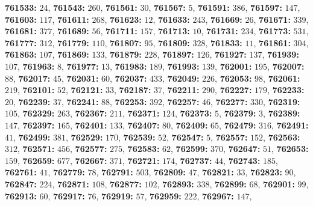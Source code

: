 \textsf{\bfseries 761533:} $24$, \textsf{\bfseries 761543:} $260$, \textsf{\bfseries 761561:} $30$, \textsf{\bfseries 761567:} $5$, \textsf{\bfseries 761591:} $386$, \textsf{\bfseries 761597:} $147$, \textsf{\bfseries 761603:} $117$, \textsf{\bfseries 761611:} $268$, \textsf{\bfseries 761623:} $12$, \textsf{\bfseries 761633:} $243$, \textsf{\bfseries 761669:} $26$, \textsf{\bfseries 761671:} $339$, \textsf{\bfseries 761681:} $377$, \textsf{\bfseries 761689:} $56$, \textsf{\bfseries 761711:} $157$, \textsf{\bfseries 761713:} $10$, \textsf{\bfseries 761731:} $234$, \textsf{\bfseries 761773:} $531$, \textsf{\bfseries 761777:} $312$, \textsf{\bfseries 761779:} $110$, \textsf{\bfseries 761807:} $95$, \textsf{\bfseries 761809:} $328$, \textsf{\bfseries 761833:} $11$, \textsf{\bfseries 761861:} $304$, \textsf{\bfseries 761863:} $107$, \textsf{\bfseries 761869:} $133$, \textsf{\bfseries 761879:} $228$, \textsf{\bfseries 761897:} $126$, \textsf{\bfseries 761927:} $137$, \textsf{\bfseries 761939:} $107$, \textsf{\bfseries 761963:} $8$, \textsf{\bfseries 761977:} $13$, \textsf{\bfseries 761983:} $189$, \textsf{\bfseries 761993:} $139$, \textsf{\bfseries 762001:} $195$, \textsf{\bfseries 762007:} $88$, \textsf{\bfseries 762017:} $45$, \textsf{\bfseries 762031:} $60$, \textsf{\bfseries 762037:} $433$, \textsf{\bfseries 762049:} $226$, \textsf{\bfseries 762053:} $98$, \textsf{\bfseries 762061:} $219$, \textsf{\bfseries 762101:} $52$, \textsf{\bfseries 762121:} $33$, \textsf{\bfseries 762187:} $37$, \textsf{\bfseries 762211:} $290$, \textsf{\bfseries 762227:} $179$, \textsf{\bfseries 762233:} $20$, \textsf{\bfseries 762239:} $37$, \textsf{\bfseries 762241:} $88$, \textsf{\bfseries 762253:} $392$, \textsf{\bfseries 762257:} $46$, \textsf{\bfseries 762277:} $330$, \textsf{\bfseries 762319:} $105$, \textsf{\bfseries 762329:} $263$, \textsf{\bfseries 762367:} $211$, \textsf{\bfseries 762371:} $124$, \textsf{\bfseries 762373:} $5$, \textsf{\bfseries 762379:} $3$, \textsf{\bfseries 762389:} $147$, \textsf{\bfseries 762397:} $165$, \textsf{\bfseries 762401:} $133$, \textsf{\bfseries 762407:} $80$, \textsf{\bfseries 762409:} $65$, \textsf{\bfseries 762479:} $316$, \textsf{\bfseries 762491:} $41$, \textsf{\bfseries 762499:} $381$, \textsf{\bfseries 762529:} $170$, \textsf{\bfseries 762539:} $52$, \textsf{\bfseries 762547:} $5$, \textsf{\bfseries 762557:} $152$, \textsf{\bfseries 762563:} $312$, \textsf{\bfseries 762571:} $456$, \textsf{\bfseries 762577:} $275$, \textsf{\bfseries 762583:} $62$, \textsf{\bfseries 762599:} $370$, \textsf{\bfseries 762647:} $51$, \textsf{\bfseries 762653:} $159$, \textsf{\bfseries 762659:} $677$, \textsf{\bfseries 762667:} $371$, \textsf{\bfseries 762721:} $174$, \textsf{\bfseries 762737:} $44$, \textsf{\bfseries 762743:} $185$, \textsf{\bfseries 762761:} $41$, \textsf{\bfseries 762779:} $78$, \textsf{\bfseries 762791:} $503$, \textsf{\bfseries 762809:} $47$, \textsf{\bfseries 762821:} $33$, \textsf{\bfseries 762823:} $90$, \textsf{\bfseries 762847:} $224$, \textsf{\bfseries 762871:} $108$, \textsf{\bfseries 762877:} $102$, \textsf{\bfseries 762893:} $338$, \textsf{\bfseries 762899:} $68$, \textsf{\bfseries 762901:} $99$, \textsf{\bfseries 762913:} $60$, \textsf{\bfseries 762917:} $76$, \textsf{\bfseries 762919:} $57$, \textsf{\bfseries 762959:} $222$, \textsf{\bfseries 762967:} $147$, 
